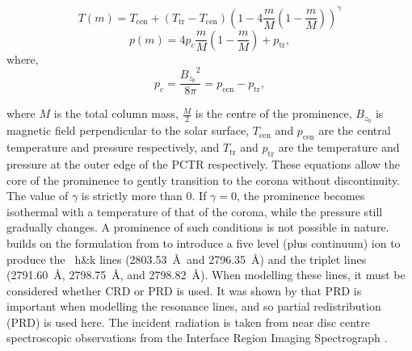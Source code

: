 \begin{equation} 
    T(m)=T_{\text{cen}}+(T_{\text{tr}}-T_{\text{cen}})\left(1-4\frac{m}{M}\left(1-\frac{m}{M}\right)\right)^\gamma
    \label{tstrat}
\end{equation}
\begin{equation}
    p(m)=4p_c\frac{m}{M}\left(1-\frac{m}{M}\right)+p_{\text{tr}},
    \label{pstrat}
\end{equation}
where,
\begin{equation}
    p_c=\frac{{B_{z_0}}^2}{8\pi}=p_{\text{cen}}-p_{\text{tr}},
    \label{pcdef}
\end{equation}

where $M$ is the total column mass, $\frac{M}{2}$ is the centre of the prominence, $B_{z_0}$ is magnetic field perpendicular to the solar surface, $T_{\text{cen}}$ and $p_{\text{cen}}$ are the central temperature and pressure respectively, and $T_{\text{tr}}$ and $p_{\text{tr}}$ are the temperature and pressure at the outer edge of the PCTR respectively. These equations \citep{anzer_prominence_1998, anzer_energy_1999,labrosse_nonlte_2004} allow the core of the prominence to gently transition to the corona without discontinuity. The value of $\gamma$ is strictly more than 0. If $\gamma=0$, the prominence becomes isothermal with a temperature of that of the corona, while the pressure still gradually changes. A prominence of such conditions is not possible in nature. \cite{levens_modelling_2019} builds on the  formulation from \cite{gouttebroze_formation_1997} to introduce a five level (plus continuum) \mgii{} ion to produce the ~h\&k lines (2803.53~\AA\ and 2796.35~\AA) and the  triplet lines (2791.60~\AA, 2798.75~\AA, and 2798.82~\AA). When modelling these lines, it must be considered whether CRD or PRD is used.  It was shown by \cite{milkey_resonance_1974} that PRD is important when modelling the \mgii{} resonance lines, and so partial redistribution (PRD) is used here. The incident \mgii{} radiation is taken from near disc centre spectroscopic  observations from the Interface Region Imaging Spectrograph \citep[IRIS;][]{depontieu_interface_2014}.
